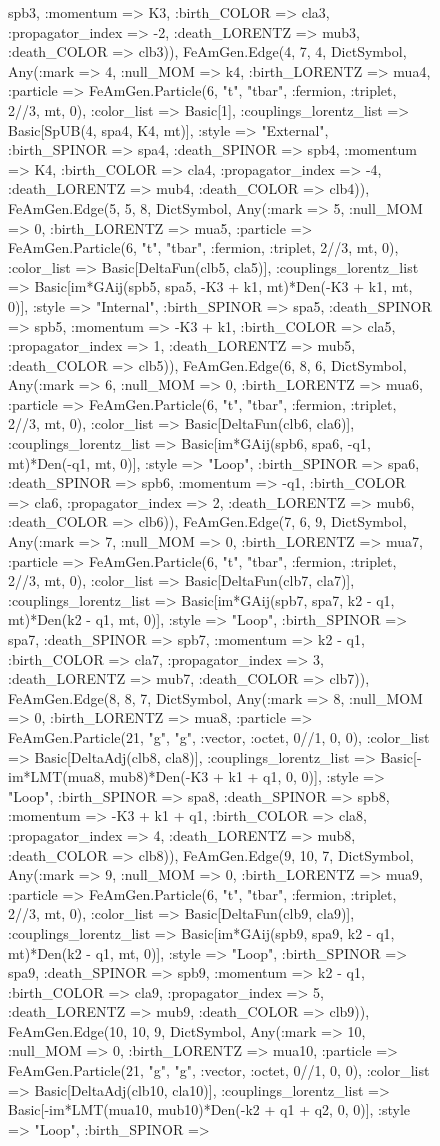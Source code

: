 \documentclass{revtex4}
\begin{document}
\begin{figure}[!htb]
\begin{center}
{spb3, :momentum => K3, :birth_COLOR => cla3, :propagator_index => -2, :death_LORENTZ => mub3, :death_COLOR => clb3)), FeAmGen.Edge(4, 7, 4, Dict{Symbol, Any}(:mark => 4, :null_MOM => k4, :birth_LORENTZ => mua4, :particle => FeAmGen.Particle(6, "t", "tbar", :fermion, :triplet, 2//3, mt, 0), :color_list => Basic[1], :couplings_lorentz_list => Basic[SpUB(4, spa4, K4, mt)], :style => "External", :birth_SPINOR => spa4, :death_SPINOR => spb4, :momentum => K4, :birth_COLOR => cla4, :propagator_index => -4, :death_LORENTZ => mub4, :death_COLOR => clb4)), FeAmGen.Edge(5, 5, 8, Dict{Symbol, Any}(:mark => 5, :null_MOM => 0, :birth_LORENTZ => mua5, :particle => FeAmGen.Particle(6, "t", "tbar", :fermion, :triplet, 2//3, mt, 0), :color_list => Basic[DeltaFun(clb5, cla5)], :couplings_lorentz_list => Basic[im*GAij(spb5, spa5, -K3 + k1, mt)*Den(-K3 + k1, mt, 0)], :style => "Internal", :birth_SPINOR => spa5, :death_SPINOR => spb5, :momentum => -K3 + k1, :birth_COLOR => cla5, :propagator_index => 1, :death_LORENTZ => mub5, :death_COLOR => clb5)), FeAmGen.Edge(6, 8, 6, Dict{Symbol, Any}(:mark => 6, :null_MOM => 0, :birth_LORENTZ => mua6, :particle => FeAmGen.Particle(6, "t", "tbar", :fermion, :triplet, 2//3, mt, 0), :color_list => Basic[DeltaFun(clb6, cla6)], :couplings_lorentz_list => Basic[im*GAij(spb6, spa6, -q1, mt)*Den(-q1, mt, 0)], :style => "Loop", :birth_SPINOR => spa6, :death_SPINOR => spb6, :momentum => -q1, :birth_COLOR => cla6, :propagator_index => 2, :death_LORENTZ => mub6, :death_COLOR => clb6)), FeAmGen.Edge(7, 6, 9, Dict{Symbol, Any}(:mark => 7, :null_MOM => 0, :birth_LORENTZ => mua7, :particle => FeAmGen.Particle(6, "t", "tbar", :fermion, :triplet, 2//3, mt, 0), :color_list => Basic[DeltaFun(clb7, cla7)], :couplings_lorentz_list => Basic[im*GAij(spb7, spa7, k2 - q1, mt)*Den(k2 - q1, mt, 0)], :style => "Loop", :birth_SPINOR => spa7, :death_SPINOR => spb7, :momentum => k2 - q1, :birth_COLOR => cla7, :propagator_index => 3, :death_LORENTZ => mub7, :death_COLOR => clb7)), FeAmGen.Edge(8, 8, 7, Dict{Symbol, Any}(:mark => 8, :null_MOM => 0, :birth_LORENTZ => mua8, :particle => FeAmGen.Particle(21, "g", "g", :vector, :octet, 0//1, 0, 0), :color_list => Basic[DeltaAdj(clb8, cla8)], :couplings_lorentz_list => Basic[-im*LMT(mua8, mub8)*Den(-K3 + k1 + q1, 0, 0)], :style => "Loop", :birth_SPINOR => spa8, :death_SPINOR => spb8, :momentum => -K3 + k1 + q1, :birth_COLOR => cla8, :propagator_index => 4, :death_LORENTZ => mub8, :death_COLOR => clb8)), FeAmGen.Edge(9, 10, 7, Dict{Symbol, Any}(:mark => 9, :null_MOM => 0, :birth_LORENTZ => mua9, :particle => FeAmGen.Particle(6, "t", "tbar", :fermion, :triplet, 2//3, mt, 0), :color_list => Basic[DeltaFun(clb9, cla9)], :couplings_lorentz_list => Basic[im*GAij(spb9, spa9, k2 - q1, mt)*Den(k2 - q1, mt, 0)], :style => "Loop", :birth_SPINOR => spa9, :death_SPINOR => spb9, :momentum => k2 - q1, :birth_COLOR => cla9, :propagator_index => 5, :death_LORENTZ => mub9, :death_COLOR => clb9)), FeAmGen.Edge(10, 10, 9, Dict{Symbol, Any}(:mark => 10, :null_MOM => 0, :birth_LORENTZ => mua10, :particle => FeAmGen.Particle(21, "g", "g", :vector, :octet, 0//1, 0, 0), :color_list => Basic[DeltaAdj(clb10, cla10)], :couplings_lorentz_list => Basic[-im*LMT(mua10, mub10)*Den(-k2 + q1 + q2, 0, 0)], :style => "Loop", :birth_SPINOR => }
\end{center}
\end{figure}
\end{document}

